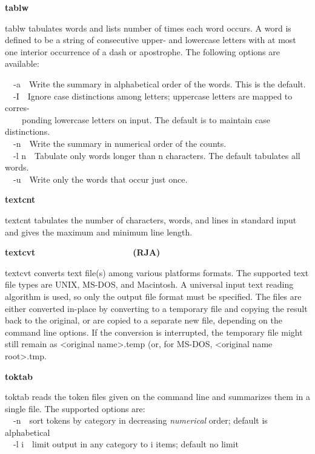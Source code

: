 {{\sffamily\bfseries
tablw\ \ \ \ \ \ \ \ \ \ \ \ \ \ \ \ \ \ \ \ \ \ }

\textsf{tablw} tabulates words and lists number of times each word
occurs. A word is defined to be a string of consecutive upper- and
lowercase letters with at most one interior occurrence of a dash or
apostrophe. The following options are available:

\texttt{\ \ }\textsf{{}-a}\ \ Write the summary in alphabetical order of
the words. This is the default.\\
\ \ \textsf{{}-I}\ \ Ignore case distinctions among letters; uppercase
letters are mapped to corres-\\
\ \  \ \ ponding lowercase letters on input. The default is to maintain
case distinctions.\\
\ \ \textsf{{}-n}\ \ Write the summary in numerical order of the
counts.\\
\ \ \textsf{{}-l n}\ \ Tabulate only words longer than n characters. The
default tabulates all words.\\
\ \ \textsf{{}-u}\ \ Write only the words that occur just once.

{\sffamily\bfseries
textcnt\ \ \ \ \ \ \ \ \ \ \ \ \ \ \ \ \ \ \ \ }

\textsf{textcnt} tabulates the number of characters,
{\textquotedbl}words{\textquotedbl}, and lines in standard input and
gives the maximum and minimum line length. 

{\sffamily\bfseries
textcvt\ \ \ \ \ \ \ \ \ \ \ \ \ \ \ \ \ \ \ \ (RJA)}

\textsf{textcvt} converts text file(s) among various
platforms{\textquotesingle} formats. The supported text file types are
UNIX, MS-DOS, and Macintosh. A universal input text reading algorithm
is used, so only the output file format must be specified. The files
are either converted in-place by converting to a temporary file and
copying the result back to the original, or are copied to a separate
new file, depending on the command line options. If the conversion is
interrupted, the temporary file might still remain as
{\textless}original name{\textgreater}.temp (or, for MS-DOS,
{\textless}original name root{\textgreater}.tmp.

{\sffamily\bfseries
toktab\ \ \ \ \ \ \ \ \ \ \ \ \ \ \ \ \ \ \ \ }

\textsf{toktab} reads the token files given on the command line and
summarizes them in a single file. The supported options are:\\
\ \ \textsf{{}-n}\ \ sort tokens by category in decreasing
\textit{numerical} order; default is alphabetical\\
\ \ \textsf{{}-l i}\ \ limit output in any category to i items; default
no limit

}
